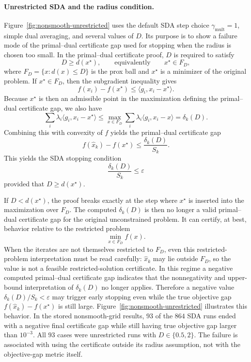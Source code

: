 \documentclass[11pt]{article}
\begin{document}
\paragraph{Unrestricted SDA and the radius condition.}
Figure~\ref{fig:nonsmooth-unrestricted} uses the default SDA step choice
\(\gamma_{\mathrm{mult}}=1\), simple dual averaging, and several values of
\(D\).  Its purpose is to show a failure mode of the primal--dual certificate
gap used for stopping when the radius is chosen too small.  In the
primal--dual certificate proof, \(D\) is required to
satisfy
\[
    D \ge d(x^\star),
    \qquad\text{equivalently}\qquad
    x^\star\in F_D,
\]
where \(F_D=\{x:d(x)\le D\}\) is the prox ball and \(x^\star\) is a minimizer of
the original problem.  If \(x^\star\in F_D\), then the subgradient inequality gives
\[
    f(x_i)-f(x^\star)\le \langle g_i,x_i-x^\star\rangle .
\]
Because \(x^\star\) is then an admissible point in the maximization defining the
primal--dual certificate gap, we also have
\[
    \sum_i \lambda_i\langle g_i,x_i-x^\star\rangle
    \le
    \max_{x\in F_D}\sum_i \lambda_i\langle g_i,x_i-x\rangle
    =\delta_k(D).
\]
Combining this with convexity of \(f\) yields the primal--dual certificate gap
\[
    f(\hat x_k)-f(x^\star)\le \frac{\delta_k(D)}{S_k}.
\]
This yields the SDA stopping condition
\[
    \frac{\delta_k(D)}{S_k}\le \varepsilon
\]
provided that \(D\ge d(x^\star)\).

If \(D<d(x^\star)\), the proof breaks exactly at the step where
\(x^\star\) is inserted into the maximization over \(F_D\).  The computed
\(\delta_k(D)\) is then no longer a valid primal--dual certificate gap for the original unconstrained
problem.  It can certify, at best, behavior relative to the restricted problem
\[
    \min_{x\in F_D} f(x).
\]
When the iterates are not themselves restricted to \(F_D\), even this
restricted-problem interpretation must be read carefully: \(\hat x_k\) may lie
outside \(F_D\), so the value is not a feasible restricted-solution certificate.
In this regime a negative computed primal--dual certificate gap indicates that
the nonnegativity and upper-bound interpretation of \(\delta_k(D)\) no longer
applies.  Therefore a negative value
\(\delta_k(D)/S_k<\varepsilon\) may trigger early stopping even while the true
objective gap \(f(\hat x_k)-f(x^\star)\) is still large.  Figure~\ref{fig:nonsmooth-unrestricted}
illustrates this behavior.  In the
stored nonsmooth-grid results, \(93\) of the \(864\) SDA runs ended with a
negative final certificate gap while still having true objective gap larger than
\(10^{-3}\).  All \(93\) cases were unrestricted runs with \(D\in\{0.5,2\}\).
The failure is associated with using the certificate outside its radius
assumption, not with the objective-gap metric itself.
\end{document}
